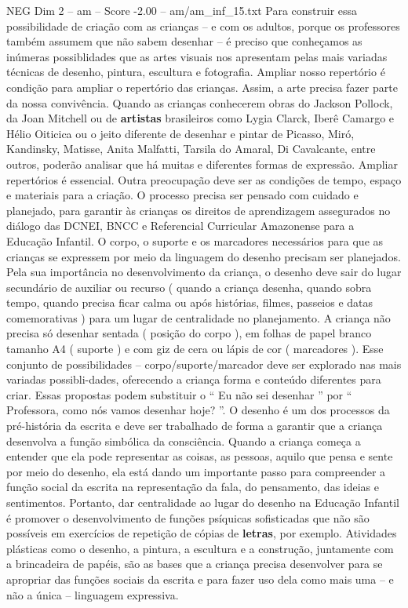 \begin{textsample}{NEG Dim 2 – am – Score -2.00 – am/am\_inf\_15.txt}
Para construir essa possibilidade de criação com as crianças – e com os adultos, porque os professores também assumem que não sabem desenhar – é preciso que conheçamos as inúmeras possiblidades que as artes visuais nos apresentam pelas mais variadas técnicas de desenho, pintura, escultura e fotografia.
Ampliar nosso repertório é condição para ampliar o repertório das crianças.
Assim, a arte precisa fazer parte da nossa convivência.
Quando as crianças conhecerem obras do Jackson Pollock, da Joan Mitchell ou de \textbf{artistas} brasileiros como Lygia Clarck, Iberê Camargo e Hélio Oiticica ou o jeito diferente de desenhar e pintar de Picasso, Miró, Kandinsky, Matisse, Anita Malfatti, Tarsila do Amaral, Di Cavalcante, entre outros, poderão analisar que há muitas e diferentes formas de expressão.
Ampliar repertórios é essencial.
Outra preocupação deve ser as condições de tempo, espaço e materiais para a criação.
O processo precisa ser pensado com cuidado e planejado, para garantir às crianças os direitos de aprendizagem assegurados no diálogo das DCNEI, BNCC e Referencial Curricular Amazonense para a Educação Infantil.
O corpo, o suporte e os marcadores necessários para que as crianças se expressem por meio da linguagem do desenho precisam ser planejados.
Pela sua importância no desenvolvimento da criança, o desenho deve sair do lugar secundário de auxiliar ou recurso ( quando a criança desenha, quando sobra tempo, quando precisa ficar calma ou após histórias, filmes, passeios e datas comemorativas ) para um lugar de centralidade no planejamento.
A criança não precisa só desenhar sentada ( posição do corpo ), em folhas de papel branco tamanho A4 ( suporte ) e com giz de cera ou lápis de cor ( marcadores ).
Esse conjunto de possibilidades – corpo/suporte/marcador deve ser explorado nas mais variadas possibli-dades, oferecendo a criança forma e conteúdo diferentes para criar.
Essas propostas podem substituir o “ Eu não sei desenhar ” por “ Professora, como nós vamos desenhar hoje? ”.
O desenho é um dos processos da pré-história da escrita e deve ser trabalhado de forma a garantir que a criança desenvolva a função simbólica da consciência.
Quando a criança começa a entender que ela pode representar as coisas, as pessoas, aquilo que pensa e sente por meio do desenho, ela está dando um importante passo para compreender a função social da escrita na representação da fala, do pensamento, das ideias e sentimentos.
Portanto, dar centralidade ao lugar do desenho na Educação Infantil é promover o desenvolvimento de funções psíquicas sofisticadas que não são possíveis em exercícios de repetição de cópias de \textbf{letras}, por exemplo.
Atividades plásticas como o desenho, a pintura, a escultura e a construção, juntamente com a brincadeira de papéis, são as bases que a criança precisa desenvolver para se apropriar das funções sociais da escrita e para fazer uso dela como mais uma – e não a única – linguagem expressiva.

\end{textsample}
